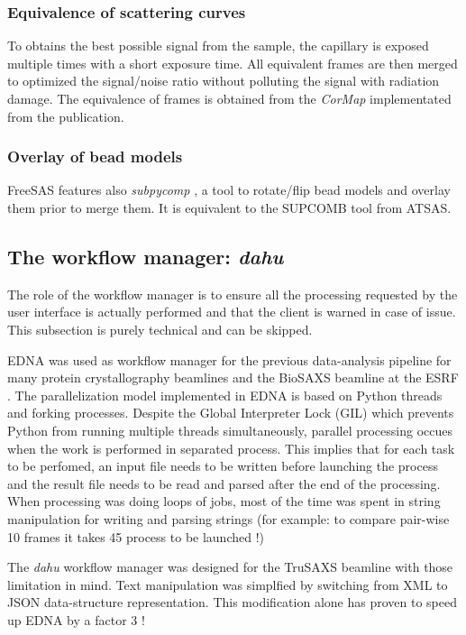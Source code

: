 \documentclass[preprint]{iucr}              %
\begin{document}
\subsubsection{Equivalence of scattering curves}
To obtains the best possible signal from the sample, the capillary is exposed multiple times with a short exposure time.
All equivalent frames are then merged to optimized the signal/noise ratio without polluting the signal with radiation damage.  
The equivalence of frames is obtained from the \textit{CorMap} \cite{cormap} implementated from the publication. 

\subsubsection{Overlay of bead models}
FreeSAS features also \textit{subpycomp} \cite{BM29ODA}, a tool to rotate/flip bead models and overlay them prior to merge them. It is equivalent to the SUPCOMB\cite{supcomb} tool from ATSAS. 

\subsection{The workflow manager: \textit{dahu}}

The role of the workflow manager is to ensure all the processing requested by the user interface is actually performed and that the client is warned in case of issue.
This subsection is purely technical and can be skipped. 

EDNA\cite{EDNA} was used as workflow manager for the previous data-analysis pipeline for many protein crystallography beamlines and the BioSAXS beamline at the ESRF \cite{BM29ODA}.
The parallelization model implemented in EDNA is based on Python threads and forking processes. 
Despite the Global Interpreter Lock (GIL) which prevents Python from running multiple threads simultaneously, parallel processing occues when the work is performed
in separated process. 
This implies that for each task to be perfomed, an input file needs to be written before launching the process and the result file needs to be read and parsed after the end of the processing.
When processing was doing loops of jobs, most of the time was spent in string manipulation for writing and parsing strings (for example: to compare pair-wise 10 frames it takes 45 process to be launched !)
 
The \textit{dahu} workflow manager was designed for the TruSAXS beamline \cite{ID02} with those limitation in mind. 
Text manipulation was simplfied by switching from XML to JSON data-structure representation. 
This modification alone has proven to speed up EDNA by a factor 3 !
\end{document}

